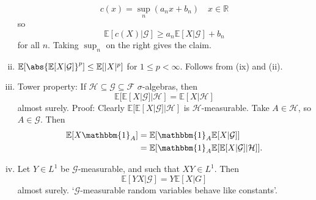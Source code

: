 \documentclass{article}
\newcommand{\G}{\mathcal{G}}
\newcommand{\1}[1]{\mathbbm{1}_{#1}}
\newcommand{\E}{\mathbb{E}}
\begin{document}
\begin{enumerate}[(i)]
    \begin{equation*}
      c(x) = \sup_n (a_n x + b_n) \quad x \in \mathbb{R}
    \end{equation*}
    so
    \begin{equation*}
      \E[c(X) | \G] \geq a_n \E[X | \G] + b_n
    \end{equation*}
    for all $n$.
    Taking $\sup_n$ on the right gives the claim.
  \item $\E[\abs{\E[X|\G]}^p] \leq \E[|X|^p]$ for $1 \leq p < \infty$. Follows from (ix) and (ii).
  \item Tower property: If $\mathcal{H} \subseteq \mathcal{G} \subseteq \mathcal{F}$ $\sigma$-algebras, then
    \begin{equation*}
    \E[\E[X|\G] | \mathcal{H}] = \E[X | \mathcal{H}]
    \end{equation*}
    almost surely.
    Proof: Clearly $\E[\E[X|\G] | \mathcal{H}]$ is $\mathcal{H}$-measurable.
    Take $A \in \mathcal{H}$, so $A \in \G$. Then
    \begin{align*}
      \E[X\1A] &= \E[\1A \E[X|\G]] \\
               &= \E[\1A \E[\E[X|\G] | \mathcal{H}]].
    \end{align*}
  \item Let $Y \in L^1$ be $\G$-measurable, and such that $XY \in L^1$. Then
    \begin{equation*}
      \E[YX | \G] = Y \E[X | G]
    \end{equation*}
    almost surely. `$\G$-measurable random variables behave like constants'.


\end{enumerate}
\end{document}
